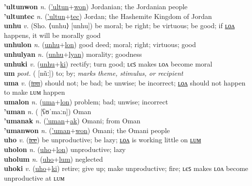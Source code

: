 \textbf{'ultunwon} \textit{n.} (\hyperref['ultun]{'ultun}+\hyperref[won]{won})
Jordanian; the Jordanian people \label{'ultunwon} \\
\textbf{'ultuntec} \textit{n.} (\hyperref['ultun]{'ultun}+\hyperref[tec]{tec})
Jordan; the Hashemite Kingdom of Jordan \label{'ultuntec} \\
\textbf{unhu} \textit{v.} (Sho. ⟨unhu⟩ [unhu])
be moral; be right; be virtuous; be good; if \hyperref[unhulon]{ʟᴏᴧ} happens, it will be morally good \label{unhu} \\
\textbf{unhulon} \textit{n.} (\hyperref[unhu]{unhu}+\hyperref[lon]{lon})
good deed; moral; right; virtuous; good \label{unhulon} \\
\textbf{unhulyan} \textit{n.} (\hyperref[unhu]{unhu}+\hyperref[lyan]{lyan})
morality; goodness \label{unhulyan} \\
\textbf{unhuki} \textit{v.} (\hyperref[unhu]{unhu}+\hyperref[ki]{ki})
rectify; turn good; ʟєꜱ makes ʟᴏᴧ become moral \label{unhuki} \\
\textbf{um} \textit{post.} ( [nũː])
to; by; \textit{marks theme, stimulus, or recipient} \label{um} \\
\textbf{uma} \textit{v.} (\hyperref[ipa]{\sout{ipa}})
should not; be bad; be unwise; be incorrect; \hyperref[umalon]{ʟᴏᴧ} should not happen to make ʟᴜᴍ happen \label{uma} \\
\textbf{umalon} \textit{n.} (\hyperref[uma]{uma}+\hyperref[lon]{lon})
problem; bad; unwise; incorrect \label{umalon} \\
\textbf{'uman} \textit{n.} ( [ʕʊˈmaːn])
Oman \label{'uman} \\
\textbf{'umanak} \textit{n.} (\hyperref['uman]{'uman}+\hyperref[ak]{ak})
Omani; from Oman \label{'umanak} \\
\textbf{'umanwon} \textit{n.} (\hyperref['uman]{'uman}+\hyperref[won]{won})
Omani; the Omani people \label{'umanwon} \\
\textbf{uho} \textit{v.} (\hyperref[ice]{\sout{ice}})
be unproductive; be lazy; \hyperref[uholon]{ʟᴏᴧ} is working little on \hyperref[uholum]{ʟᴜᴍ} \label{uho} \\
\textbf{uholon} \textit{n.} (\hyperref[uho]{uho}+\hyperref[lon]{lon})
unproductive; lazy \label{uholon} \\
\textbf{uholum} \textit{n.} (\hyperref[uho]{uho}+\hyperref[lum]{lum})
neglected \label{uholum} \\
\textbf{uhoki} \textit{v.} (\hyperref[uho]{uho}+\hyperref[ki]{ki})
retire; give up; make unproductive; fire; ʟєꜱ makes ʟᴏᴧ become unproductive at ʟᴜᴍ \label{uhoki} \\
